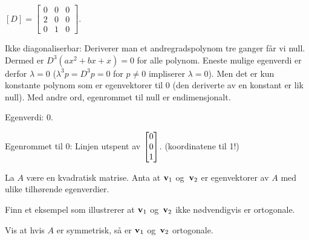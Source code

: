 \begin{losning}

\begin{punkt}
$[D]=\begin{bmatrix}
0 & 0 & 0\\
2 & 0 & 0\\
0 & 1 & 0
\end{bmatrix}$.
\end{punkt}

\begin{punkt}
Ikke diagonaliserbar: Deriverer man et andregradspolynom tre ganger får vi null. Dermed er $D^3(ax^2+bx+x)=0$ for alle polynom. Eneste mulige egenverdi er derfor $\lambda=0$ ($\lambda^3p=D^3p=0$ for $p\neq 0$ impliserer $\lambda=0$). Men det er kun konstante polynom som er egenvektorer til 0 (den deriverte av en konstant er lik null). Med andre ord, egenrommet til null er endimensjonalt.
\end{punkt}

\begin{punkt}
Egenverdi: 0.

\noindent
Egenrommet til 0: Linjen utspent av $\begin{bmatrix} 0 \\ 0 \\ 1 \end{bmatrix}$. (koordinatene til 1!)
\end{punkt}


\end{losning}

\begin{oppgave}
La $A$ være en kvadratisk matrise. Anta at $\mathbf{v}_1$ og~$\mathbf{v}_2$ er egenvektorer av $A$ med ulike tilhørende egenverdier.

\begin{punkt}
Finn et eksempel som illustrerer at $\mathbf{v}_1$ og~$\mathbf{v}_2$ ikke nødvendigvis er ortogonale.
\end{punkt}

\begin{punkt}
Vis at hvis $A$ er symmetrisk, så er $\mathbf{v}_1$ og~$\mathbf{v}_2$ ortogonale.
\end{punkt}

\end{oppgave}

